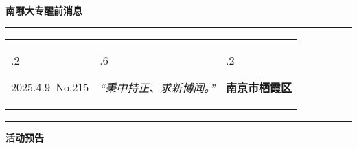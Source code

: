\documentclass[letterpaper, 12pt]{article}
\begin{document}
\begin{center}
    \Huge\textbf{南哪大专醒前消息}
\end{center}
\vspace{4mm}
\hrule
\renewcommand\tabularxcolumn[1]{m{#1}}
\begin{tabularx}{\textwidth}{>{\hsize.2\hsize}X>{\hsize.6\hsize}X>{\hsize.2\hsize}X}
    \begin{flushleft}
        2025.4.9\, No.215
    \end{flushleft}
    &
    \begin{center}
        \textit{“秉中持正、求新博闻。”}
    \end{center}
    &
    \begin{flushright}
        \textbf{南京市栖霞区}
    \end{flushright}
\end{tabularx}
\vspace{-3.5mm}
\hrule
\vspace{4mm}
\centerline{\huge\textbf{活动预告}}
\end{document}
